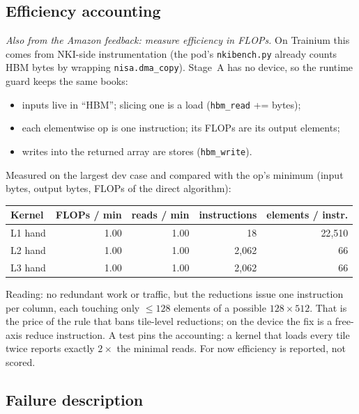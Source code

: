 \documentclass[11pt]{article}
\newcommand{\code}[1]{\texttt{#1}}
\begin{document}
\subsection{Efficiency accounting}
\label{sec:eff}

\emph{Also from the Amazon feedback: measure efficiency in FLOPs.} On Trainium this comes from
NKI-side instrumentation (the pod's \code{nkibench.py} already counts HBM bytes by wrapping
\code{nisa.dma\_copy}). Stage~A has no device, so the runtime guard keeps the same books:

\begin{itemize}
  \item inputs live in ``HBM''; slicing one is a load (\code{hbm\_read} += bytes);
  \item each elementwise op is one instruction; its FLOPs are its output elements;
  \item writes into the returned array are stores (\code{hbm\_write}).
\end{itemize}
Measured on the largest dev case and compared with the op's minimum (input bytes, output bytes,
FLOPs of the direct algorithm):

\begin{tabular}{@{}lrrrr@{}}
\toprule
Kernel & FLOPs / min & reads / min & instructions & elements / instr. \\
\midrule
L1 hand & 1.00 & 1.00 & 18 & 22{,}510 \\
L2 hand & 1.00 & 1.00 & 2{,}062 & 66 \\
L3 hand & 1.00 & 1.00 & 2{,}062 & 66 \\
\bottomrule
\end{tabular}

\medskip
Reading: no redundant work or traffic, but the reductions issue one instruction per column, each
touching only $\le 128$ elements of a possible $128\times512$. That is the price of the rule that
bans tile-level reductions; on the device the fix is a free-axis reduce instruction. A test pins
the accounting: a kernel that loads every tile twice reports exactly $2\times$ the minimal reads.
For now efficiency is reported, not scored.

\subsection{Failure description}
\end{document}
